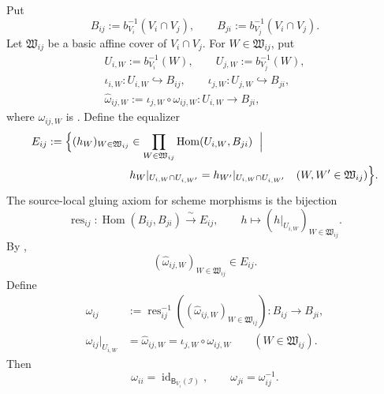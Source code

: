 \begin{lemma}
  \label{lemma:nagata-global-blowup-overlap-id-symm}

  Put
  \[
    B_{ij}:=b_{V_i}^{-1}(V_i\cap V_j),\qquad
    B_{ji}:=b_{V_j}^{-1}(V_i\cap V_j).
  \]
  Let $\mathfrak W_{ij}$ be a basic affine cover of $V_i\cap V_j$.  For
  $W\in\mathfrak W_{ij}$, put
  \[
  \begin{gathered}
    U_{i,W}:=b_{V_i}^{-1}(W),\qquad
    U_{j,W}:=b_{V_j}^{-1}(W),\\
    \iota_{i,W}\colon U_{i,W}\hookrightarrow B_{ij},\qquad
    \iota_{j,W}\colon U_{j,W}\hookrightarrow B_{ji},\\
    \widehat\omega_{ij,W}:=
      \iota_{j,W}\circ\omega_{ij,W}\colon U_{i,W}\longrightarrow B_{ji},
  \end{gathered}
  \]
  where $\omega_{ij,W}$ is
  .  Define the equalizer
  \[
  \begin{aligned}
    E_{ij}:=\Bigl\{(h_W)_{W\in\mathfrak W_{ij}}
      &\in\prod_{W\in\mathfrak W_{ij}}
        \operatorname{Hom}(U_{i,W},B_{ji})\ \Bigm|\ {}\\
      &h_W|_{U_{i,W}\cap U_{i,W'}}
       =h_{W'}|_{U_{i,W}\cap U_{i,W'}}
       \quad(W,W'\in\mathfrak W_{ij})\Bigr\}.
  \end{aligned}
  \]
  The source-local gluing axiom for scheme morphisms is the bijection
  \[
    \operatorname{res}_{ij}\colon
      \operatorname{Hom}(B_{ij},B_{ji})
      \xrightarrow{\ \sim\ }E_{ij},\qquad
    h\longmapsto(h|_{U_{i,W}})_{W\in\mathfrak W_{ij}}.
  \]
  By ,
  \[
    (\widehat\omega_{ij,W})_{W\in\mathfrak W_{ij}}\in E_{ij}.
  \]
  Define
  \[
  \begin{aligned}
    \omega_{ij}
      &:=\operatorname{res}_{ij}^{-1}
        ((\widehat\omega_{ij,W})_{W\in\mathfrak W_{ij}})
        \colon B_{ij}\longrightarrow B_{ji},\\
    \omega_{ij}|_{U_{i,W}}&=\widehat\omega_{ij,W}
      =\iota_{j,W}\circ\omega_{ij,W}
      \qquad(W\in\mathfrak W_{ij}).
  \end{aligned}
  \]
  Then
  \[
    \omega_{ii}=\operatorname{id}_{\mathsf B_{V_i}(\mathcal I)},
    \qquad
    \omega_{ji}=\omega_{ij}^{-1}.
  \]
\end{lemma}

